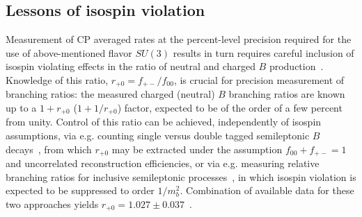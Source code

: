 \subsection{Lessons of isospin violation}
Measurement of CP averaged rates at the percent-level precision required for the use of above-mentioned flavor $SU(3)$ results \cite{Jung:2012mp, Ligeti:2015yma} in turn requires careful inclusion of isospin violating effects in the ratio of neutral and charged $B$ production~\cite{Jung:2015yma}. Knowledge of this ratio, $r_{+0} = f_{+-}/f_{00}$, is crucial for precision measurement of branching ratios:  the measured charged (neutral) $B$ branching ratios are known up to a $1 + r_{+0}$ ($1 + 1/r_{+0}$) factor, expected to be of the order of a few percent from unity. Control of this ratio can be achieved, independently of isospin assumptions, via e.g. counting single versus double tagged semileptonic $B$ decays~\cite{Aubert:2005bq}, from which $r_{+0}$ may be extracted under the assumption $f_{00} + f_{+-} = 1$ and uncorrelated reconstruction efficiencies, or via e.g. measuring relative branching ratios for inclusive semileptonic processes~\cite{Hastings:2002ff,HFAG}, in which isospin violation is expected to be suppressed to order $1/m_{b}^2$. Combination of available data for these two approaches yields $r_{+0} = 1.027 \pm 0.037$~\cite{Jung:2015yma}.

%

\endinput



%




